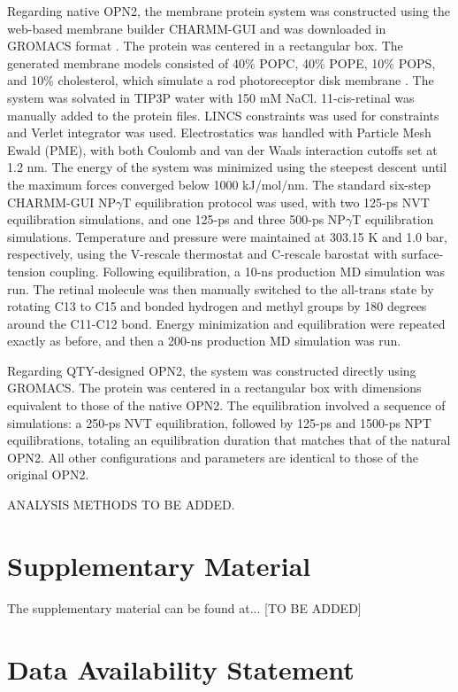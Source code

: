 \documentclass[fleqn,10pt,lineno]{manuscript}
\begin{document}
Regarding native OPN2, the membrane protein system was constructed using the web-based membrane builder CHARMM-GUI and was downloaded in GROMACS format \citep{Jo_2008, Wu_2014, Lee_2016}. The protein was centered in a rectangular box. The generated membrane models consisted of 40\% POPC, 40\% POPE, 10\% POPS, and 10\% cholesterol, which simulate a rod photoreceptor disk membrane \citep{Albert_2005}. The system was solvated in TIP3P water with 150 mM NaCl. 11-cis-retinal was manually added to the protein files. LINCS constraints was used for constraints and Verlet integrator was used. Electrostatics was handled with Particle Mesh Ewald (PME), with both Coulomb and van der Waals interaction cutoffs set at 1.2 nm. The energy of the system was minimized using the steepest descent until the maximum forces converged below 1000 kJ/mol/nm. The standard six-step CHARMM-GUI NP$\gamma$T equilibration protocol \citep{Jo_2008} was used, with two 125-ps NVT equilibration simulations, and one 125-ps and three 500-ps NP$\gamma$T equilibration simulations. Temperature and pressure were maintained at 303.15 K and 1.0 bar, respectively, using the V-rescale thermostat and C-rescale barostat with surface-tension coupling. Following equilibration, a 10-ns production MD simulation was run. The retinal molecule was then manually switched to the all-trans state by rotating C13 to C15 and bonded hydrogen and methyl groups by 180 degrees around the C11-C12 bond. Energy minimization and equilibration were repeated exactly as before, and then a 200-ns production MD simulation was run. 

Regarding QTY-designed OPN2, the system was constructed directly using GROMACS. The protein was centered in a rectangular box with dimensions equivalent to those of the native OPN2. The equilibration involved a sequence of simulations: a 250-ps NVT equilibration, followed by 125-ps and 1500-ps NPT equilibrations, totaling an equilibration duration that matches that of the natural OPN2. All other configurations and parameters are identical to those of the original OPN2.

ANALYSIS METHODS TO BE ADDED.

\section*{Supplementary Material}

The supplementary material can be found at... [TO BE ADDED]

\section*{Data Availability Statement} 
\end{document}
